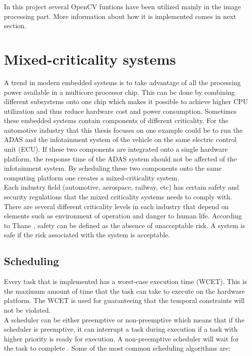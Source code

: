 In this project several OpenCV funtions have been utilized mainly in the image processing part. More information about how it is implemented comes in next section.

\section{Mixed-criticality systems}
A trend in modern embedded systems is to take advantage of all the processing power available in a multicore processor chip. This can be done by combining different subsystems onto one chip which makes it possible to achieve higher CPU utilization and thus reduce hardware cost and power consumption. Sometimes these embedded systems contain components of different criticality. For the automotive industry that this thesis focuses on one example could be to run the ADAS and the infotainment system of the vehicle on the same electric control unit (ECU). If these two components are integrated onto a single hardware platform, the response time of the ADAS system should not be affected of the infotainment system. By scheduling these two components onto the same computing platform one creates a mixed-criticality system.\\

Each industry field (automotive, aerospace, railway, etc) has certain safety and security regulations that the mixed criticality systems needs to comply with. There are several different criticality levels in each industry that depend on elements such as environment of operation and danger to human life\cite{zaki2016}. According to Thane \cite{SIL}, safety can be defined as the absence of unacceptable risk. A system is safe if the risk associated with the system is acceptable. 


\subsection{Scheduling}
Every task that is implemented has a worst-case execution time (WCET). This is the maximum amount of time that the task can take to execute on the hardware platform. The WCET is used for guaranteeing that the temporal constraints will not be violated.\\

A scheduler can be either preemptive or non-preemptive which means that if the scheduler is preemptive, it can interrupt a task during execution if a task with higher priority is ready for execution. A non-preemptive scheduler will wait for the task to complete \cite{RTSS}. Some of the most common scheduling algorithms are:

